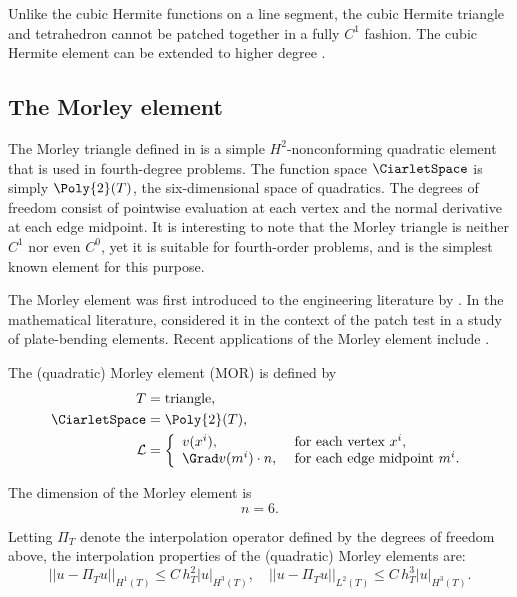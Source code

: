 Unlike the cubic Hermite functions on a line segment, the cubic
Hermite triangle and tetrahedron cannot be patched together in a fully
$C^1$ fashion. The cubic Hermite element can be extended to higher
degree \citep{BrennerScott2008}.


\subsection{The Morley element}

The Morley triangle defined in \citet{Morley1968} is a simple
$H^2$-nonconforming quadratic element that is used in fourth-degree
problems. The function space $\CiarletSpace$ is simply $\Poly{2}(T)$,
the six-dimensional space of quadratics. The degrees of freedom
consist of pointwise evaluation at each vertex and the normal
derivative at each edge midpoint. It is interesting to note that the
Morley triangle is neither $C^1$ nor even $C^0$, yet it is suitable
for fourth-order problems, and is the simplest known element for this
purpose.

The Morley element was first introduced to the engineering literature
by \citet{Morley1968,Morley1971}. In the mathematical literature,
\citet{LascauxLesaint1975} considered it in the context of the patch
test in a study of plate-bending elements. Recent applications of the
Morley element include \citet{HuangGuoShi2008,MinXu2006}.

\begin{definition}
  The (quadratic) Morley element ($\mathrm{MOR}$) is defined by
  \begin{align}
    T &= \mathrm{triangle}, \\
    \CiarletSpace &= \Poly{2}(T), \\
    \mathcal{L} &=
    \left \{
    \begin{array}{ll}
      v(x^i),
      &\text{ for each vertex } x^i, \\
      \Grad v(m^i) \cdot n,
      &\text{ for each edge midpoint } m^i. \\
    \end{array}
    \right.
  \end{align}
\end{definition}
The dimension of the Morley element is
\begin{equation}
  n = 6.
\end{equation}

Letting $\Pi_T$ denote the interpolation operator defined by the
degrees of freedom above, the interpolation properties of the
(quadratic) Morley elements are:
\begin{equation}
  ||u - \Pi_T u||_{H^1(T)} \leqslant C \, h_T^{2} |u|_{H^3(T)}, \quad
  ||u - \Pi_T u||_{L^2(T)} \leqslant C \, h_T^{3} |u|_{H^3(T)}.
\end{equation}

